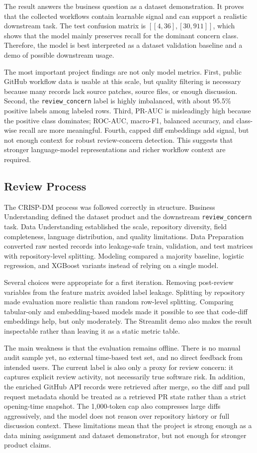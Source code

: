 The result answers the business question as a dataset demonstration. It proves that the collected workflows contain learnable signal and can support a realistic downstream task. The test confusion matrix is \([[4,36],[30,911]]\), which shows that the model mainly preserves recall for the dominant concern class. Therefore, the model is best interpreted as a dataset validation baseline and a demo of possible downstream usage.

The most important project findings are not only model metrics. First, public GitHub workflow data is usable at this scale, but quality filtering is necessary because many records lack source patches, source files, or enough discussion. Second, the \texttt{review\_concern} label is highly imbalanced, with about 95.5\% positive labels among labeled rows. Third, PR-AUC is misleadingly high because the positive class dominates; ROC-AUC, macro-F1, balanced accuracy, and class-wise recall are more meaningful. Fourth, capped diff embeddings add signal, but not enough context for robust review-concern detection. This suggests that stronger language-model representations and richer workflow context are required.

\subsection{Review Process}

The CRISP-DM process was followed correctly in structure. Business Understanding defined the dataset product and the downstream \texttt{review\_concern} task. Data Understanding established the scale, repository diversity, field completeness, language distribution, and quality limitations. Data Preparation converted raw nested records into leakage-safe train, validation, and test matrices with repository-level splitting. Modeling compared a majority baseline, logistic regression, and XGBoost variants instead of relying on a single model.

Several choices were appropriate for a first iteration. Removing post-review variables from the feature matrix avoided label leakage. Splitting by repository made evaluation more realistic than random row-level splitting. Comparing tabular-only and embedding-based models made it possible to see that code-diff embeddings help, but only moderately. The Streamlit demo also makes the result inspectable rather than leaving it as a static metric table.

The main weakness is that the evaluation remains offline. There is no manual audit sample yet, no external time-based test set, and no direct feedback from intended users. The current label is also only a proxy for review concern: it captures explicit review activity, not necessarily true software risk. In addition, the enriched GitHub API records were retrieved after merge, so the diff and pull request metadata should be treated as a retrieved PR state rather than a strict opening-time snapshot. The 1,000-token cap also compresses large diffs aggressively, and the model does not reason over repository history or full discussion context. These limitations mean that the project is strong enough as a data mining assignment and dataset demonstrator, but not enough for stronger product claims.

